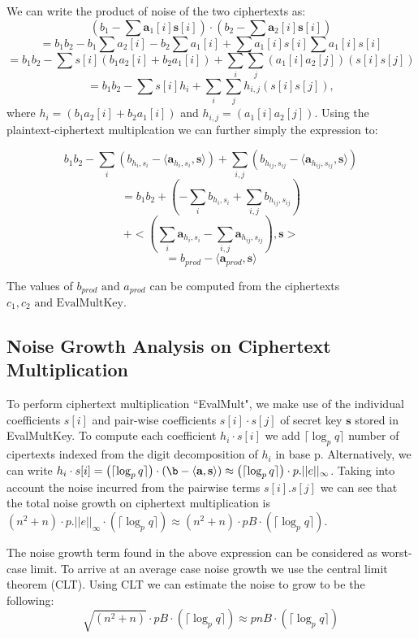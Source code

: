 \documentclass[10pt,journal,compsoc]{IEEEtran}
\theoremstyle{definition}
\begin{document}
We can write the product of noise of the two ciphertexts as:
$$\left(b_1 - \sum \textbf{a}_1[i]\textbf{s}[i] \right)\cdot \left(b_2 - \sum \textbf{a}_2[i]\textbf{s}[i] \right)$$
$$= b_1b_2 - b_1\sum a_{2}[i] - b_2\sum a_{1}[i] + \sum a_1[i]s[i]\sum a_1[i]s[i]$$
$$= b_1b_2 - \sum s[i]\left(b_1a_{2}[i] + b_2 a_{1}[i]\right) + \sum_i\sum_j\left(a_1[i]a_2[j]\right)\left(s[i]s[j]\right)$$
$$= b_1b_2 - \sum s[i]h_i + \sum_i\sum_jh_{i,j}\left(s[i]s[j]\right),$$
where $h_i = \left(b_1a_{2}[i] + b_2 a_{1}[i]\right)$ and $h_{i,j} = \left(a_1[i]a_2[j]\right)$.
Using the plaintext-ciphertext multiplcation we can further simply the expression to:

$$b_1b_2 - \sum_i \left(b_{h_i,s_i} - \langle \textbf{a}_{h_i,s_i},\textbf{s} \rangle\right) + \sum_{i,j} \left(b_{h_{ij},s_{ij}} - \langle \textbf{a}_{h_{ij},s_{ij}},\textbf{s} \rangle\right)$$
$$= b_1b_2 + \left(-\sum_i b_{h_i,s_i} + \sum_{i,j} b_{h_{ij},s_{ij}}\right)$$ 
$$+ \biggl< \left( \sum_i \textbf{a}_{h_i,s_i} - \sum_{i,j}  \textbf{a}_{h_{ij},s_{ij}}\right),\textbf{s}\biggr>$$
$$= b_{prod} - \langle \textbf{a}_{prod},\textbf{s}\rangle $$

The values of $b_{prod} \textrm{ and } a_{prod}$ can be computed from the ciphertexts $c_1, c_2 \textrm{ and EvalMultKey} $.
\subsection{Noise Growth Analysis on Ciphertext Multiplication}

To perform ciphertext multiplication ``EvalMult", we make use of the individual coefficients $s[i]$ and pair-wise coefficients $s[i]\cdot s[j]$ of secret key $\textbf{s}$ stored in EvalMultKey. To compute each coefficient $h_i \cdot s[i]$ we add $\lceil \log_p q \rceil$ number of cipertexts indexed from the digit decomposition of $h_i$ in base p. Alternatively, we can write $h_i\cdot s[i] = \left(\lceil \log_p q \rceil\right)\cdot \left(\b - \langle \textbf{a},\textbf{s} \rangle\right) \approx \left(\lceil \log_p q \rceil\right)\cdot p.||e||_\infty$. Taking into account the noise incurred from the pairwise terms $s[i].s[j]$ we can see that the total noise growth on ciphertext multiplication is $\left(n^2 + n\right)\cdot p.||e||_\infty \cdot \left(\lceil \log_p q \rceil\right) \approx \left(n^2 + n\right)\cdot pB \cdot \left(\lceil \log_p q \rceil\right)$.

The noise growth term found in the above expression can be considered as worst-case limit. To arrive at an average case noise growth we use the central limit theorem (CLT). Using CLT we can estimate the noise to grow to be the following:
$$\sqrt{\left( n^2+n\right)}\cdot pB \cdot \left(\lceil \log_p q \rceil\right) \approx pnB \cdot \left(\lceil \log_p q \rceil\right)$$   
\end{document}

